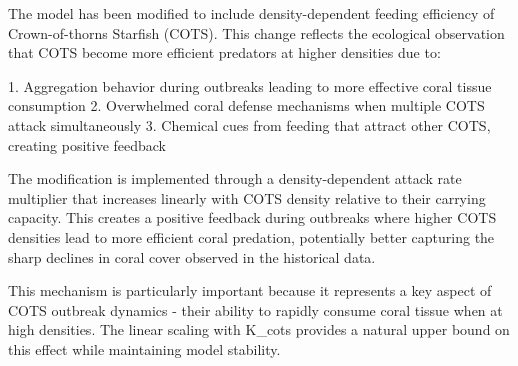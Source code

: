 The model has been modified to include density-dependent feeding efficiency of Crown-of-thorns Starfish (COTS). This change reflects the ecological observation that COTS become more efficient predators at higher densities due to:

1. Aggregation behavior during outbreaks leading to more effective coral tissue consumption
2. Overwhelmed coral defense mechanisms when multiple COTS attack simultaneously
3. Chemical cues from feeding that attract other COTS, creating positive feedback

The modification is implemented through a density-dependent attack rate multiplier that increases linearly with COTS density relative to their carrying capacity. This creates a positive feedback during outbreaks where higher COTS densities lead to more efficient coral predation, potentially better capturing the sharp declines in coral cover observed in the historical data.

This mechanism is particularly important because it represents a key aspect of COTS outbreak dynamics - their ability to rapidly consume coral tissue when at high densities. The linear scaling with K_cots provides a natural upper bound on this effect while maintaining model stability.
